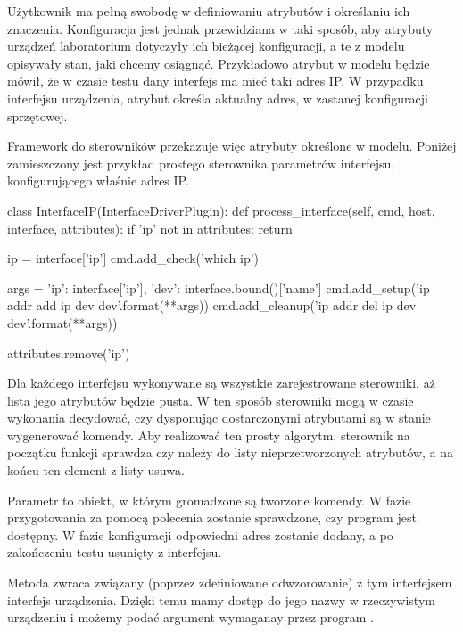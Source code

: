 \documentclass[00-praca-magisterska.tex]{subfiles}
\begin{document}
Użytkownik ma pełną swobodę w definiowaniu atrybutów i określaniu ich
znaczenia. Konfiguracja jest jednak przewidziana w taki sposób, aby atrybuty
urządzeń laboratorium dotyczyły ich bieżącej konfiguracji, a te z modelu
opisywały stan, jaki chcemy osiągnąć. Przykładowo atrybut  w modelu
będzie mówił, że w czasie testu dany interfejs ma mieć taki adres IP. W
przypadku interfejsu urządzenia, atrybut  określa aktualny adres, w
zastanej konfiguracji sprzętowej.

Framework do sterowników przekazuje więc atrybuty określone w modelu. Poniżej
zamieszczony jest przykład prostego sterownika parametrów interfejsu,
konfigurującego właśnie adres IP.

\begin{pythoncode}
  class InterfaceIP(InterfaceDriverPlugin):
      def process_interface(self, cmd, host, interface, attributes):
          if 'ip' not in attributes:
              return
  
          ip = interface['ip']
          cmd.add_check('which ip')
  
          args = {'ip': interface['ip'],
                  'dev': interface.bound()['name']}
          cmd.add_setup('ip addr add {ip} dev {dev}'.format(**args))
          cmd.add_cleanup('ip addr del {ip} dev {dev}'.format(**args))
  
          attributes.remove('ip')

\end{pythoncode}

Dla każdego interfejsu wykonywane są wszystkie zarejestrowane sterowniki, aż
lista jego atrybutów będzie pusta. W ten sposób sterowniki mogą w czasie
wykonania decydować, czy dysponując dostarczonymi atrybutami są w stanie
wygenerować komendy. Aby realizować ten prosty algorytm, sterownik na początku
funkcji  sprawdza czy  należy do listy
nieprzetworzonych atrybutów, a na końcu ten element z listy usuwa.

Parametr  to obiekt, w którym gromadzone są tworzone komendy. W fazie
przygotowania za pomocą polecenia  zostanie sprawdzone, czy program
 jest dostępny. W fazie konfiguracji odpowiedni adres zostanie dodany,
a po zakończeniu testu usunięty z interfejsu.

Metoda  zwraca związany (poprzez zdefiniowane
odwzorowanie) z tym interfejsem interfejs urządzenia. Dzięki temu mamy dostęp do
jego nazwy w rzeczywistym urządzeniu i możemy podać argument wymaganay przez
program .
\end{document}
